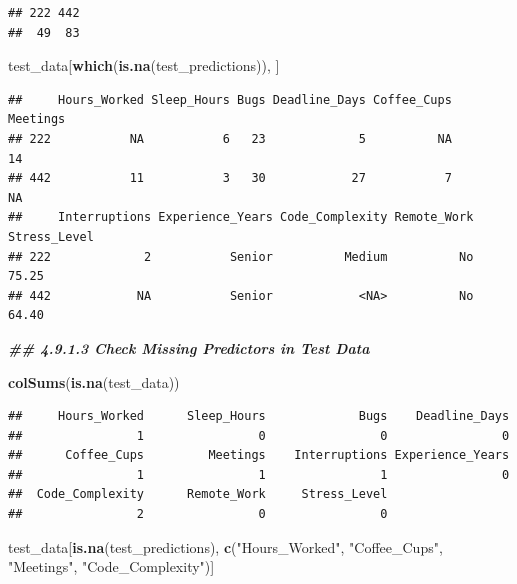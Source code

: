 \documentclass[
]{article}
\newenvironment{Shaded}{\begin{snugshade}}{\end{snugshade}}
\newcommand{\DocumentationTok}[1]{\textcolor[rgb]{0.56,0.35,0.01}{\textbf{\textit{#1}}}}
\newcommand{\FunctionTok}[1]{\textcolor[rgb]{0.13,0.29,0.53}{\textbf{#1}}}
\newcommand{\NormalTok}[1]{#1}
\newcommand{\StringTok}[1]{\textcolor[rgb]{0.31,0.60,0.02}{#1}}
\begin{document}
\begin{verbatim}
## 222 442 
##  49  83
\end{verbatim}

\begin{Shaded}
\begin{Highlighting}[]
\NormalTok{test\_data[}\FunctionTok{which}\NormalTok{(}\FunctionTok{is.na}\NormalTok{(test\_predictions)), ]}
\end{Highlighting}
\end{Shaded}

\begin{verbatim}
##     Hours_Worked Sleep_Hours Bugs Deadline_Days Coffee_Cups Meetings
## 222           NA           6   23             5          NA       14
## 442           11           3   30            27           7       NA
##     Interruptions Experience_Years Code_Complexity Remote_Work Stress_Level
## 222             2           Senior          Medium          No        75.25
## 442            NA           Senior            <NA>          No        64.40
\end{verbatim}

\begin{Shaded}
\begin{Highlighting}[]
\DocumentationTok{\#\# 4.9.1.3 Check Missing Predictors in Test Data}

\FunctionTok{colSums}\NormalTok{(}\FunctionTok{is.na}\NormalTok{(test\_data))}
\end{Highlighting}
\end{Shaded}

\begin{verbatim}
##     Hours_Worked      Sleep_Hours             Bugs    Deadline_Days 
##                1                0                0                0 
##      Coffee_Cups         Meetings    Interruptions Experience_Years 
##                1                1                1                0 
##  Code_Complexity      Remote_Work     Stress_Level 
##                2                0                0
\end{verbatim}

\begin{Shaded}
\begin{Highlighting}[]
\NormalTok{test\_data[}\FunctionTok{is.na}\NormalTok{(test\_predictions), }
          \FunctionTok{c}\NormalTok{(}\StringTok{"Hours\_Worked"}\NormalTok{,}
            \StringTok{"Coffee\_Cups"}\NormalTok{,}
            \StringTok{"Meetings"}\NormalTok{,}
            \StringTok{"Code\_Complexity"}\NormalTok{)]}
\end{Highlighting}
\end{Shaded}
\end{document}
